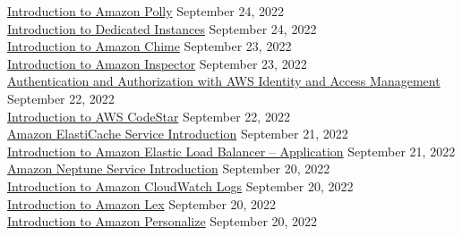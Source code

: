 \documentclass[10pt]{res} %
\begin{document}
\begin{resume}
\href{https://bjdelacruz.dev/files/certificates/pluralsight/Introduction_to_Amazon_Polly.pdf}{\color{blue}Introduction to Amazon Polly} \hfill September 24, 2022 \\
\href{https://bjdelacruz.dev/files/certificates/pluralsight/Introduction_to_Dedicated_Instances.pdf}{\color{blue}Introduction to Dedicated Instances} \hfill September 24, 2022 \\
\href{https://bjdelacruz.dev/files/certificates/pluralsight/Introduction_to_Amazon_Chime.pdf}{\color{blue}Introduction to Amazon Chime} \hfill September 23, 2022 \\
\href{https://bjdelacruz.dev/files/certificates/pluralsight/Introduction_to_Amazon_Inspector.pdf}{\color{blue}Introduction to Amazon Inspector} \hfill September 23, 2022 \\
\href{https://bjdelacruz.dev/files/certificates/pluralsight/Authentication_and_Authorization_with_AWS_Identity_and_Access_Management.pdf}{\color{blue}Authentication and Authorization with AWS Identity and Access Management} \hfill September 22, 2022 \\
\href{https://bjdelacruz.dev/files/certificates/pluralsight/Introduction_to_AWS_CodeStar.pdf}{\color{blue}Introduction to AWS CodeStar} \hfill September 22, 2022 \\
\href{https://bjdelacruz.dev/files/certificates/pluralsight/Amazon_ElastiCache_Service_Introduction.pdf}{\color{blue}Amazon ElastiCache Service Introduction} \hfill September 21, 2022 \\
\href{https://bjdelacruz.dev/files/certificates/pluralsight/Introduction_to_Amazon_Elastic_Load_Balancer_Application.pdf}{\color{blue}Introduction to Amazon Elastic Load Balancer -- Application} \hfill September 21, 2022 \\
\href{https://bjdelacruz.dev/files/certificates/pluralsight/Amazon_Neptune_Service_Introduction.pdf}{\color{blue}Amazon Neptune Service Introduction} \hfill September 20, 2022 \\
\href{https://bjdelacruz.dev/files/certificates/pluralsight/Introduction_to_Amazon_CloudWatch_Logs.pdf}{\color{blue}Introduction to Amazon CloudWatch Logs} \hfill September 20, 2022 \\
\href{https://bjdelacruz.dev/files/certificates/pluralsight/Introduction_to_Amazon_Lex.pdf}{\color{blue}Introduction to Amazon Lex} \hfill September 20, 2022 \\
\href{https://bjdelacruz.dev/files/certificates/pluralsight/Introduction_to_Amazon_Personalize.pdf}{\color{blue}Introduction to Amazon Personalize} \hfill September 20, 2022 \\

\end{resume}
\end{document}
